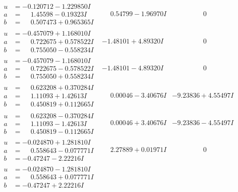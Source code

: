 \documentclass[1p]{elsarticle_modified}
\theoremstyle{definition}
\begin{document}
$$\begin{array}{c|c|c}
\begin{aligned}
u &= -0.120712 - 1.229850 I \\
a &= \phantom{-}1.45598 - 0.19323 I \\
b &= \phantom{-}0.507473 + 0.965365 I\end{aligned}
 & \phantom{-}0.54799 - 1.96970 I & \phantom{-0.000000 } 0 \\ \hline\begin{aligned}
u &= -0.457079 + 1.168010 I \\
a &= \phantom{-}0.722675 + 0.578522 I \\
b &= \phantom{-}0.755050 - 0.558234 I\end{aligned}
 & -1.48101 + 4.89320 I & \phantom{-0.000000 } 0 \\ \hline\begin{aligned}
u &= -0.457079 - 1.168010 I \\
a &= \phantom{-}0.722675 - 0.578522 I \\
b &= \phantom{-}0.755050 + 0.558234 I\end{aligned}
 & -1.48101 - 4.89320 I & \phantom{-0.000000 } 0 \\ \hline\begin{aligned}
u &= \phantom{-}0.623208 + 0.370284 I \\
a &= \phantom{-}1.11093 + 1.42613 I \\
b &= \phantom{-}0.450819 + 0.112665 I\end{aligned}
 & \phantom{-}0.00046 - 3.40676 I & -9.23836 + 4.55497 I \\ \hline\begin{aligned}
u &= \phantom{-}0.623208 - 0.370284 I \\
a &= \phantom{-}1.11093 - 1.42613 I \\
b &= \phantom{-}0.450819 - 0.112665 I\end{aligned}
 & \phantom{-}0.00046 + 3.40676 I & -9.23836 - 4.55497 I \\ \hline\begin{aligned}
u &= -0.024870 + 1.281810 I \\
a &= \phantom{-}0.558643 - 0.077771 I \\
b &= -0.47247 - 2.22216 I\end{aligned}
 & \phantom{-}2.27889 + 0.01971 I & \phantom{-0.000000 } 0 \\ \hline\begin{aligned}
u &= -0.024870 - 1.281810 I \\
a &= \phantom{-}0.558643 + 0.077771 I \\
b &= -0.47247 + 2.22216 I\end{aligned}

\end{array}$$
\end{document}
